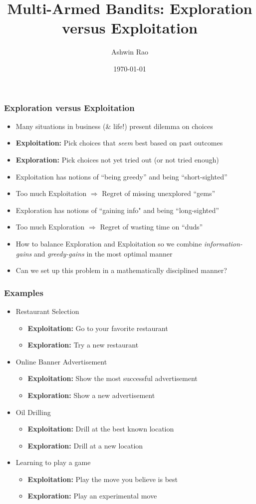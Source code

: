 \documentclass[handout]{beamer}
\title[Multi-Armed Bandits]{Multi-Armed Bandits: Exploration versus Exploitation} %
\author{Ashwin Rao} %
\institute[Stanford] %
{
ICME, Stanford University
}
\date{\today} %
\begin{document}
\begin{frame}
\titlepage %
\end{frame}


\begin{frame}
\frametitle{Exploration versus Exploitation}
\pause
\begin{itemize}[<+->]
\item Many situations in business (\& life!) present dilemma on choices
\item {\bf Exploitation:} Pick choices that {\em seem} best based on past outcomes
\item {\bf Exploration:} Pick choices not yet tried out (or not tried enough)
\item Exploitation has notions of ``being greedy'' and being ``short-sighted''
\item Too much Exploitation $\Rightarrow$ Regret of missing unexplored ``gems''
\item Exploration has notions of ``gaining info" and being ``long-sighted''
\item Too much Exploration $\Rightarrow$ Regret of wasting time on ``duds''
\item How to balance Exploration and Exploitation so we combine {\em information-gains} and {\em greedy-gains} in the most optimal manner
\item Can we set up this problem in a mathematically disciplined manner?
\end{itemize}
\end{frame}

\begin{frame}
\frametitle{Examples}
\pause
\begin{itemize}[<+->]
\item Restaurant Selection
\begin{itemize}
\item {\bf Exploitation:} Go to your favorite restaurant
\item {\bf Exploration:} Try a new restaurant
\end{itemize}
\item Online Banner Advertisement
\begin{itemize}
\item {\bf Exploitation:} Show the most successful advertisement
\item {\bf Exploration:} Show a new advertisement
\end{itemize}
\item Oil Drilling
\begin{itemize}
\item {\bf Exploitation:} Drill at the best known location
\item {\bf Exploration:} Drill at a new location
\end{itemize}
\item Learning to play a game
\begin{itemize}
\item {\bf Exploitation:} Play the move you believe is best
\item {\bf Exploration:} Play an experimental move
\end{itemize}
\end{itemize}
\end{frame}
\end{document}
